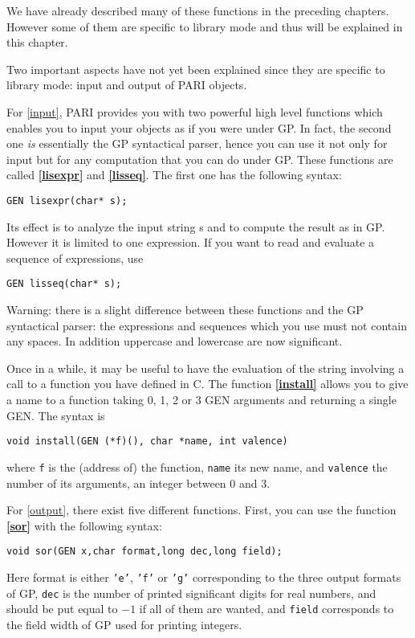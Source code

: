 We have already described many of these functions in the preceding chapters.
However some of them are specific to library mode and thus will be explained
in this chapter.


Two important aspects have not yet been explained since they are specific
to library mode: input and output of PARI objects.

For \ref{input}, PARI provides you with two powerful high level functions which enables
you to input your objects as if you were under GP. In fact, the second
one {\sl is \/}
essentially the GP syntactical parser, hence you can use it not only for
input but for any computation that you can do under GP. These functions are
called {\bf \ref{lisexpr}} and {\bf \ref{lisseq}}. The first one has the following syntax:

{\tt GEN lisexpr(char* s);}

Its effect is to analyze the input string s and to compute the result as in GP.
However it is limited to one expression. If you want to read and evaluate
a sequence of expressions, use

{\tt GEN lisseq(char* s);}

Warning: there is a slight difference between these functions and the GP
syntactical parser: the expressions and sequences which you use must not
contain any spaces. In addition uppercase and lowercase are now significant.

Once in a while, it may be useful to have the evaluation of the string
involving
a call to a function you have defined in C. The function {\bf \ref{install}}
allows you to give a name to a function taking 0, 1, 2 or 3 GEN arguments and
returning a single GEN. The syntax is 

{\tt void install(GEN (*f)(), char *name, int valence)}

where {\tt f} is the (address of) the function, {\tt name} its new name, and
{\tt valence} the number of its arguments, an integer between 0 and 3.

For \ref{output}, there exist five different functions. First, you can
use the function {\bf \ref{sor}} with the following syntax:

{\tt void sor(GEN x,char format,long dec,long field);}

Here format is either {\tt 'e'}, {\tt 'f'} or {\tt 'g'} corresponding to
the three output formats of GP, {\tt dec} is the number of printed significant
digits for real numbers, and should be put equal to $-1$ if all of them are
wanted, and {\tt field} corresponds to the field width of GP used for printing
integers.

